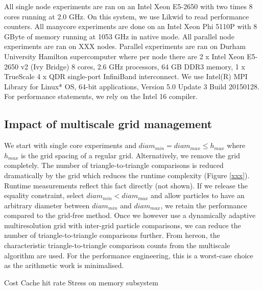 All single node experiments are ran on an Intel Xeon E5-2650 with two times 8
cores running at 2.0 GHz. 
On this system, we use Likwid \cite{Treibig:10:Likwid} to read performance
counters.
All manycore experiments are done on an Intel Xeon Phi 5110P with 8 GByte of
memory running  at 1053 GHz in native mode.
All parallel node experiments are ran on XXX nodes. Parallel experiments are ran on Durham University Hamilton supercomputer where per node there are 2 x Intel Xeon E5-2650 v2 (Ivy Bridge) 8 cores, 2.6 GHz processors, 64 GB DDR3 memory, 1 x TrueScale 4 x QDR single-port InfiniBand interconnect.
We use Intel(R) MPI Library for Linux* OS, 64-bit applications, Version 5.0 Update 3  Build 20150128. 
For performance statements, we rely on the Intel 16 compiler.



\subsection{Impact of multiscale grid management}

We start with single core experiments and $diam_{min} = diam_{max} \leq
h_{max}$ where $h_{max}$ is the grid spacing of a regular grid.
Alternatively, we remove the grid completely.
The number of triangle-to-triangle comparisons is reduced dramatically by the
grid which reduces the runtime complexity (Figure \ref{xxx}).
Runtime measurements reflect this fact directly (not shown).
If we release the equality constraint, select $diam_{min} < diam_{max}$ and
allow particles to have an arbitrary diameter between $diam_{min}$ and
$diam_{max}$, we retain the performance compared to the grid-free method.
Once we however use a dynamically adaptive multiresolution grid with inter-grid
particle comparisons, we can reduce the number of triangle-to-triangle
comparisons further. 
From hereon, the characteristic triangle-to-triangle comparison counts from the
multiscale algorithm are used.
For the performance engineering, this is a worst-case choice as the arithmetic
work is minimalised.





Cost
Cache hit rate
Stress on memory subsystem
